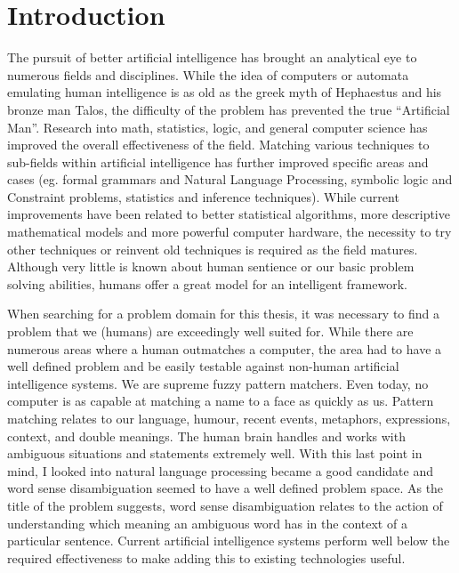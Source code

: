 \chapter{Introduction}

The pursuit of better artificial intelligence has brought an analytical eye to
numerous fields and disciplines.  While the idea of computers or automata
emulating human intelligence is as old as the greek myth of Hephaestus and his
bronze man Talos\cite{TALOS}, the difficulty of the problem has prevented the
true ``Artificial Man''.  Research into math, statistics, logic, and general
computer science has improved the overall effectiveness of the field. Matching
various techniques to sub-fields within artificial intelligence has further
improved specific areas and cases (eg. formal grammars and Natural Language
Processing, symbolic logic and Constraint problems, statistics and inference
techniques). While current improvements have been related to better statistical
algorithms, more descriptive mathematical models and more powerful computer
hardware, the necessity to try other techniques or reinvent old techniques is
required as the field matures.  Although very little is known about human
sentience or our basic problem solving abilities, humans offer a great model for
an intelligent framework.

When searching for a problem domain for this thesis, it was necessary to find a
problem that we (humans) are exceedingly well suited for.  While there are
numerous areas where a human outmatches a computer, the area had to have a well
defined problem and be easily testable against non-human artificial intelligence
systems.  We are supreme fuzzy pattern matchers.  Even today, no computer is as
capable at matching a name to a face as quickly as us.  Pattern matching relates
to our language, humour, recent events, metaphors, expressions, context, and
double meanings. The human brain handles and works with ambiguous situations and
statements extremely well.  With this last point in mind, I looked into natural
language processing became a good candidate and word sense disambiguation seemed
to have a well defined problem space.  As the title of the problem suggests,
word sense disambiguation relates to the action of understanding which meaning
an ambiguous word has in the context of a particular sentence. Current
artificial intelligence systems perform well below the required effectiveness to
make adding this to existing technologies useful.

